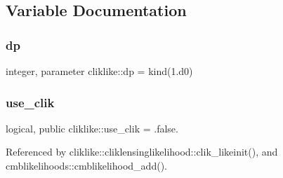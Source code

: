 \subsection{Variable Documentation}
\mbox{\label{namespacecliklike_a809e60ab23d53a4785481b88524bf355}} 
\subsubsection{\texorpdfstring{dp}{dp}}
{\footnotesize\ttfamily integer, parameter cliklike\+::dp = kind(1.d0)}

\mbox{\label{namespacecliklike_ab3a813fb756b21053772e9783f44ee73}} 
\subsubsection{\texorpdfstring{use\+\_\+clik}{use\_clik}}
{\footnotesize\ttfamily logical, public cliklike\+::use\+\_\+clik = .false.}



Referenced by cliklike\+::cliklensinglikelihood\+::clik\+\_\+likeinit(), and cmblikelihoods\+::cmblikelihood\+\_\+add().

